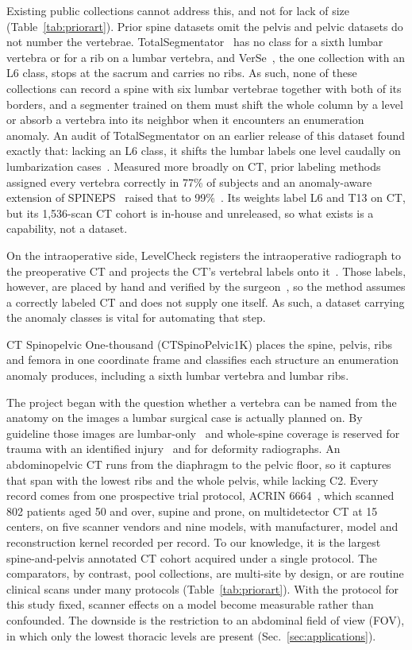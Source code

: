 \documentclass[aapm,mph,amsmath,amssymb,preprint,linenumbers]{revtex4-2}
\begin{document}
Existing public collections cannot address this, and not for lack of size
(Table~\ref{tab:priorart}). Prior spine datasets omit the pelvis and pelvic datasets do not number
the vertebrae. TotalSegmentator~\cite{totalsegmentator} has no class for a sixth lumbar vertebra or for a rib on a
lumbar vertebra, and VerSe~\cite{verse2021}, the one collection with an L6 class, stops at the sacrum and
carries no ribs. As such, none of these collections can record a spine with six lumbar vertebrae together with both of its
borders, and a segmenter trained on them must shift the
whole column by a level or absorb a vertebra into its neighbor when it encounters an enumeration anomaly. An audit of TotalSegmentator on an earlier release of this dataset found exactly that: lacking an L6 class, it shifts the lumbar labels one level caudally on lumbarization cases~\cite{neurips2026lstv}. Measured more broadly
on CT, prior labeling methods assigned every vertebra correctly in 77\% of subjects and
an anomaly-aware extension of SPINEPS~\cite{spineps2025} raised that to
99\%~\cite{veridah2026}. Its weights label L6 and T13 on CT, but its 1{,}536-scan CT cohort is in-house and
unreleased, so what exists is a capability, not a dataset. 

On the intraoperative side, LevelCheck registers the intraoperative
radiograph to the preoperative CT and projects the CT's vertebral labels onto
it~\cite{otake2012,lo2015,desilva2016}. Those labels, however, are placed by hand and verified by
the surgeon~\cite{otake2012}, so the method assumes a correctly labeled CT and does not supply
one itself. As such, a dataset carrying the anomaly classes is vital for automating that step.

CT Spinopelvic One-thousand (CTSpinoPelvic1K) places the spine, pelvis, ribs and femora in one coordinate frame and classifies each structure an enumeration anomaly produces, including a sixth lumbar vertebra and lumbar ribs.

The project began with the question whether a vertebra can be named from the anatomy on the images a lumbar surgical case is actually planned on. By guideline those images are lumbar-only~\cite{acr2021,nass2013,acrct2022,acrmri2023} and whole-spine coverage is reserved for trauma with an identified
injury~\cite{sixta2012,tqip2018} and for deformity
radiographs. An abdominopelvic CT runs from the diaphragm to the pelvic floor, so it captures
that span with the lowest ribs and the whole pelvis, while lacking C2. Every record
comes from one prospective trial protocol, ACRIN 6664~\cite{colonog,tcia}, which scanned 802 patients aged 50 and over, supine and prone, on multidetector CT at 15 centers, on five scanner
vendors and nine models, with manufacturer, model and reconstruction kernel recorded per
record. To our knowledge, it is the largest spine-and-pelvis annotated CT cohort acquired under a
single protocol. The comparators, by contrast, pool collections, are multi-site by design, or are
routine clinical scans under many protocols (Table~\ref{tab:priorart}). With the protocol for this study fixed, scanner effects on a model become measurable rather than confounded. The downside is the restriction to an abdominal field of view (FOV), in which only the lowest thoracic levels are present
(Sec.~\ref{sec:applications}).
\end{document}
